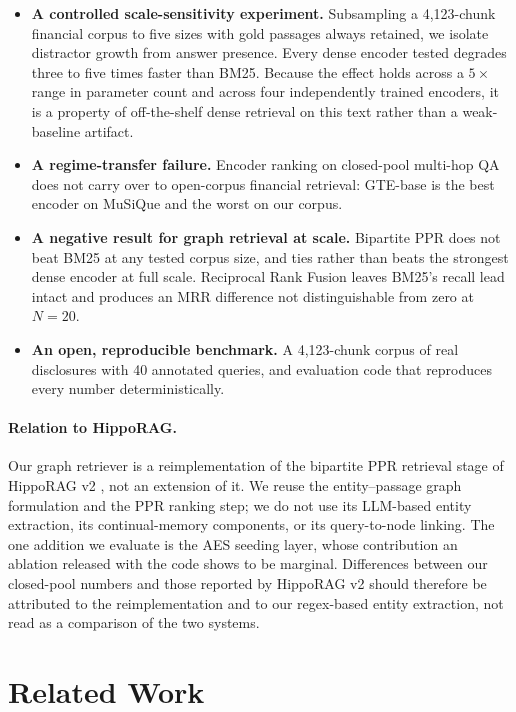 \documentclass[runningheads]{llncs}
\begin{document}
\begin{itemize}[noitemsep,topsep=0pt,parsep=0pt,partopsep=0pt]
    \item \textbf{A controlled scale-sensitivity experiment.} Subsampling a 4{,}123-chunk financial corpus to five sizes with gold passages always retained, we isolate distractor growth from answer presence. Every dense encoder tested degrades three to five times faster than BM25. Because the effect holds across a $5\times$ range in parameter count and across four independently trained encoders, it is a property of off-the-shelf dense retrieval on this text rather than a weak-baseline artifact.
    \item \textbf{A regime-transfer failure.} Encoder ranking on closed-pool multi-hop QA does not carry over to open-corpus financial retrieval: GTE-base is the best encoder on MuSiQue and the worst on our corpus.
    \item \textbf{A negative result for graph retrieval at scale.} Bipartite PPR does not beat BM25 at any tested corpus size, and ties rather than beats the strongest dense encoder at full scale. Reciprocal Rank Fusion leaves BM25's recall lead intact and produces an MRR difference not distinguishable from zero at $N{=}20$.
    \item \textbf{An open, reproducible benchmark.} A 4{,}123-chunk corpus of real disclosures with 40 annotated queries, and evaluation code that reproduces every number deterministically.
\end{itemize}

\paragraph{Relation to HippoRAG.} Our graph retriever is a reimplementation of the bipartite PPR retrieval stage of HippoRAG v2 \cite{gutierrez2025hipporag2}, not an extension of it. We reuse the entity--passage graph formulation and the PPR ranking step; we do not use its LLM-based entity extraction, its continual-memory components, or its query-to-node linking. The one addition we evaluate is the AES seeding layer, whose contribution an ablation released with the code shows to be marginal. Differences between our closed-pool numbers and those reported by HippoRAG v2 should therefore be attributed to the reimplementation and to our regex-based entity extraction, not read as a comparison of the two systems.

\section{Related Work}
\label{sec:related_work}
\end{document}
